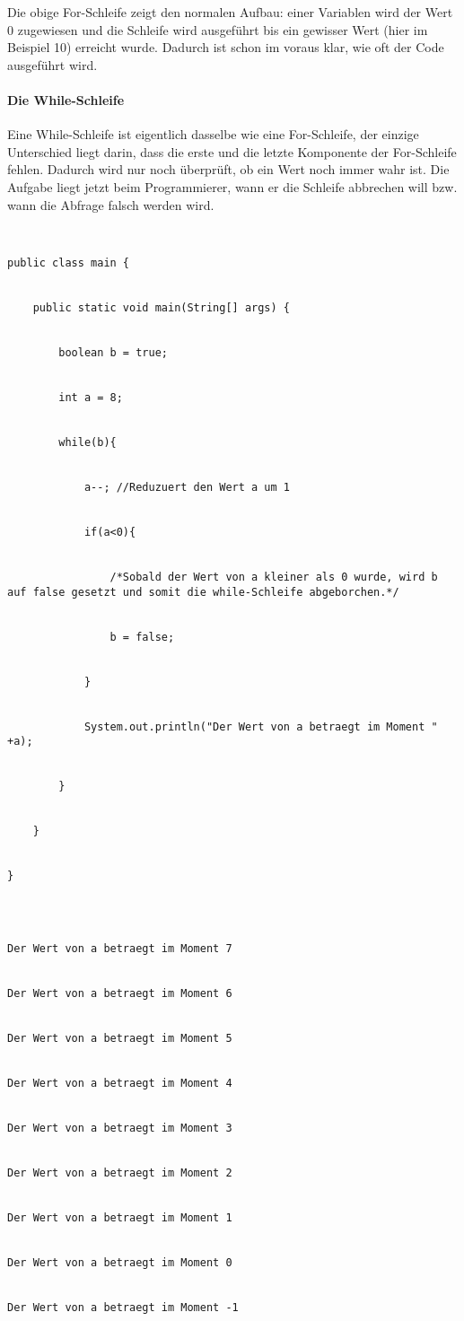 Die obige For-Schleife zeigt den normalen Aufbau: einer Variablen wird der Wert 0 zugewiesen und die Schleife wird ausgeführt bis ein gewisser Wert (hier im Beispiel 10) erreicht wurde. Dadurch ist schon im voraus klar, wie oft der Code ausgeführt wird.


\paragraph{Die While-Schleife}


Eine While-Schleife ist eigentlich dasselbe wie eine For-Schleife, der einzige Unterschied liegt darin, dass die erste und die letzte Komponente der For-Schleife fehlen. Dadurch wird nur noch überprüft, ob ein Wert noch immer wahr ist. Die Aufgabe liegt jetzt beim Programmierer, wann er die Schleife abbrechen will bzw. wann die Abfrage falsch werden wird.


\begin{lstlisting}


public class main {


	public static void main(String[] args) {


		boolean b = true;


		int a = 8;


		while(b){


			a--; //Reduzuert den Wert a um 1


			if(a<0){


				/*Sobald der Wert von a kleiner als 0 wurde, wird b auf false gesetzt und somit die while-Schleife abgeborchen.*/


				b = false;


			}


			System.out.println("Der Wert von a betraegt im Moment " +a);


		}


	}


}


\end{lstlisting}


\begin{lstlisting}[style=console]


Der Wert von a betraegt im Moment 7


Der Wert von a betraegt im Moment 6


Der Wert von a betraegt im Moment 5


Der Wert von a betraegt im Moment 4


Der Wert von a betraegt im Moment 3


Der Wert von a betraegt im Moment 2


Der Wert von a betraegt im Moment 1


Der Wert von a betraegt im Moment 0


Der Wert von a betraegt im Moment -1


\end{lstlisting}


